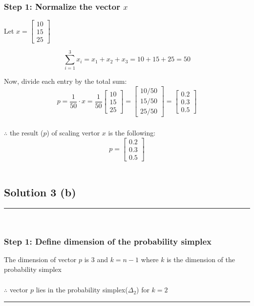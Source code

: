 \documentclass{article}
\begin{document}
\subsubsection*{Step 1: Normalize the vector $x$}
\parbox{\textwidth}{
Let $x = \begin{bmatrix} 10 \\ 15 \\ 25 \end{bmatrix}$

$$\sum_{i=1}^{3} x_{i} = x_{1} + x_{2} + x_{3} = 10 + 15 + 25 = 50$$

Now, divide each entry by the total sum:\\

$$p = \frac{1}{50} \cdot x = \frac{1}{50} \begin{bmatrix} 10 \\ 15 \\ 25 \end{bmatrix} = \begin{bmatrix} 10/50 \\ 15/50 \\ 25/50 \end{bmatrix} = \begin{bmatrix} 0.2 \\ 0.3 \\ 0.5 \end{bmatrix}$$
}
\subsubsection*{\normalfont}{$\therefore$ the result ($p$) of scaling vertor $x$ is the following:}
$$p = \begin{bmatrix} 0.2 \\ 0.3 \\ 0.5 \end{bmatrix}$$ \\

\subsection*{Solution 3 (b)}
\noindent\rule{\textwidth}{0.4pt}\\
\subsubsection*{Step 1: Define dimension of the probability simplex}
\parbox{\textwidth}{
The dimension of vector $p$ is $3$ and $k=n-1$ where $k$ is the dimension of the probability simplex
}
\subsubsection*{\normalfont}{$\therefore$ vector $p$ lies in the probability simplex($\Delta_2$) for $k=2$}

\noindent\rule{\textwidth}{0.4pt}\\

\newpage
\end{document}
